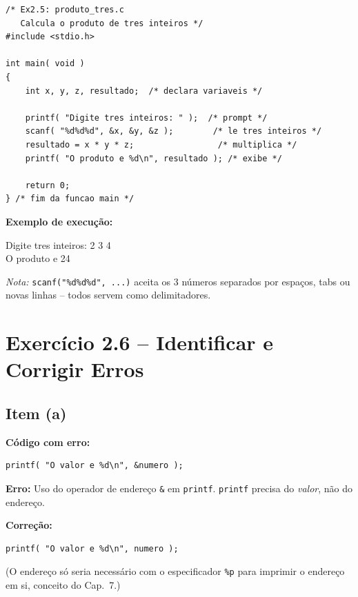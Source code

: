 \documentclass[12pt,a4paper]{article}
\begin{document}
\begin{respostabox}
\begin{lstlisting}
/* Ex2.5: produto_tres.c
   Calcula o produto de tres inteiros */
#include <stdio.h>

int main( void )
{
    int x, y, z, resultado;  /* declara variaveis */

    printf( "Digite tres inteiros: " );  /* prompt */
    scanf( "%d%d%d", &x, &y, &z );        /* le tres inteiros */
    resultado = x * y * z;                 /* multiplica */
    printf( "O produto e %d\n", resultado ); /* exibe */

    return 0;
} /* fim da funcao main */
\end{lstlisting}

\textbf{Exemplo de execução:}
\begin{saida}
Digite tres inteiros: 2 3 4\\
O produto e 24
\end{saida}

\textit{Nota:} \texttt{scanf("\%d\%d\%d", ...)} aceita os 3 números separados por
espaços, tabs ou novas linhas -- todos servem como delimitadores.
\end{respostabox}

\newpage

\section{Exercício 2.6 -- Identificar e Corrigir Erros}

\subsection*{Item (a)}
\begin{respostabox}
\textbf{Código com erro:}
\begin{lstlisting}
printf( "O valor e %d\n", &numero );
\end{lstlisting}

\textbf{Erro:} Uso do operador de endereço \texttt{\&} em \texttt{printf}.
\texttt{printf} precisa do \textit{valor}, não do endereço.

\textbf{Correção:}
\begin{lstlisting}
printf( "O valor e %d\n", numero );
\end{lstlisting}

(O endereço só seria necessário com o especificador \texttt{\%p} para imprimir o
endereço em si, conceito do Cap.~7.)
\end{respostabox}
\end{document}
